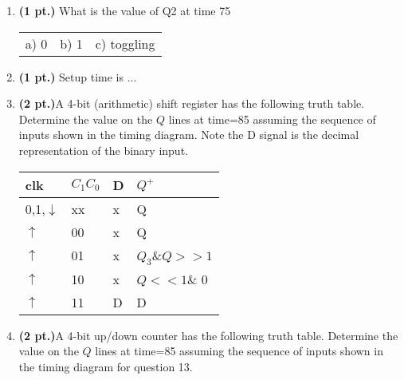\documentclass{article}
\begin{document}
\begin{enumerate}
\item {\bf (1 pt.)} What is the value of Q2 at time 75

\begin{tabular}{p{0.75in}p{0.75in}p{1.75in}}
a) 0 & b) 1 & c) toggling \\
\end{tabular}

\item {\bf (1 pt.)} Setup time is ...


\pagebreak
\item {\bf (2 pt.)}A 4-bit (arithmetic) shift register has the 
following truth table.  Determine the value on the $Q$ lines 
at time=85 assuming the sequence of inputs shown in the 
timing diagram. Note the D signal is the decimal representation
of the binary input.

\begin{tabular}{l|l|l||l}
clk		& $C_1 C_0$	& D & $Q^+$	\\ \hline
0,1,$\downarrow$& xx		& x & Q		\\ \hline
$\uparrow$ 	& 00		& x & Q		\\  \hline
$\uparrow$ 	& 01		& x & $Q_3$\&$Q>>1$	\\  \hline
$\uparrow$ 	& 10		& x & $Q<<1$\& 0	\\  \hline
$\uparrow$ 	& 11		& D & D		\\
\end{tabular}



\item {\bf (2 pt.)}A 4-bit up/down counter has the 
following truth table.  Determine the value on the $Q$ lines 
at time=85 assuming the sequence of inputs shown in the 
timing diagram for question 13. 


\end{enumerate}
\end{document}
